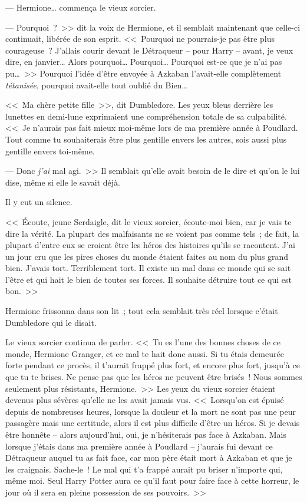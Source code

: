 --- Hermione… commença le vieux sorcier.

--- Pourquoi~?~>> dit la voix de Hermione, et il semblait maintenant que celle-ci continuait, libérée de son esprit. <<~Pourquoi ne pourrais-je pas être plus courageuse~? J'allais courir devant le Détraqueur -- pour Harry -- avant, je veux dire, en janvier… Alors pourquoi… Pourquoi… Pourquoi est-ce que je n'ai pas pu…~>> Pourquoi l'idée d'être envoyée à Azkaban l'avait-elle complètement \emph{tétanisée}, pourquoi avait-elle tout oublié du Bien…

<<~Ma chère petite fille~>>, dit Dumbledore. Les yeux bleus derrière les lunettes en demi-lune exprimaient une compréhension totale de sa culpabilité. <<~Je n'aurais pas fait mieux moi-même lors de ma première année à Poudlard. Tout comme tu souhaiterais être plus gentille envers les autres, sois aussi plus gentille envers toi-même.

--- Donc \emph{j'ai} mal agi.~>> Il semblait qu'elle avait besoin de le dire et qu'on le lui dise, même si elle le savait déjà.

Il y eut un silence.

<<~Écoute, jeune Serdaigle, dit le vieux sorcier, écoute-moi bien, car je vais te dire la vérité. La plupart des malfaisants ne se voient pas comme tels~; de fait, la plupart d'entre eux se croient être les héros des histoires qu'ils se racontent. J'ai un jour cru que les pires choses du monde étaient faites au nom du plus grand bien. J'avais tort. Terriblement tort. Il existe un mal dans ce monde qui se sait l'être et qui hait le bien de toutes ses forces. Il souhaite détruire tout ce qui est bon.~>>

Hermione frissonna dans son lit~; tout cela semblait très réel lorsque c'était Dumbledore qui le disait.

Le vieux sorcier continua de parler. <<~Tu es l'une des bonnes choses de ce monde, Hermione Granger, et ce mal te hait donc aussi. Si tu étais demeurée forte pendant ce procès, il t'aurait frappé plus fort, et encore plus fort, jusqu'à ce que tu te brises. Ne pense pas que les héros ne peuvent être brisés~! Nous sommes seulement plus résistants, Hermione.~>> Les yeux du vieux sorcier étaient devenus plus sévères qu'elle ne les avait jamais vus. <<~Lorsqu'on est épuisé depuis de nombreuses heures, lorsque la douleur et la mort ne sont pas une peur passagère mais une certitude, alors il est plus difficile d'être un héros. Si je devais être honnête -- alors aujourd'hui, oui, je n'hésiterais pas face à Azkaban. Mais lorsque j'étais dans ma première année à Poudlard -- j'aurais fui devant ce Détraqueur auquel tu as fait face, car mon père était mort à Azkaban et que je les craignais. Sache-le~! Le mal qui t'a frappé aurait pu briser n'importe qui, même moi. Seul Harry Potter aura ce qu'il faut pour faire face à cette horreur, le jour où il sera en pleine possession de ses pouvoirs.~>>

